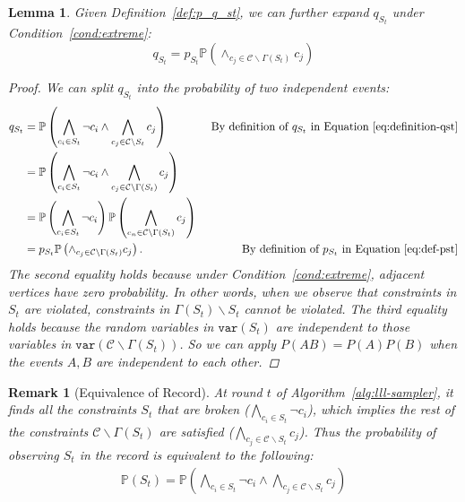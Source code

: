 \documentclass[letterpaper]{article} %
\newtheorem{remark}{Remark}
\newtheorem{lemma}{Lemma}
\newcommand{\var}{\mathtt{var}}
\newcommand{\p}{\mathbb{P}}
\begin{document}
\begin{lemma} \label{lem:recursion_start}
Given Definition~\ref{def:p_q_st}, we can further expand $q_{S_t}$ under Condition~\ref{cond:extreme}:
\begin{equation*}
q_{S_t}= p_{S_t}\p \left( \wedge_{c_j \in \mathcal{C}\backslash \Gamma(S_t)}c_j\right)
\end{equation*}
\begin{proof}
We can split $q_{S_t}$ into the probability of two independent events:
\begin{align*} 
    q_{S_t}&=\p\left(\bigwedge_{c_i \in S_t}\neg{c}_i \wedge \bigwedge_{c_j \in \mathcal{C}\backslash S_t}c_j\right) &\text{ By definition of $q_{S_t}$ in Equation~\eqref{eq:definition-qst}}\\
    &=\p\left(\bigwedge_{c_i \in S_t}\neg{c}_i \wedge \bigwedge_{c_j \in \mathcal{C}\backslash \Gamma(S_t)}c_j\right) \\
    &=\p\left(\bigwedge_{c_i \in S_t}\neg{c}_i\right) \p \left( \bigwedge_{c_n \in \mathcal{C}\backslash \Gamma(S_t)}c_j\right)\\
    &= p_{S_t}\p \left( \wedge_{c_j \in \mathcal{C}\backslash \Gamma(S_t)}c_j\right). &\text{ By definition of $p_{S_t}$ in Equation~\eqref{eq:def-pst}}
\end{align*}
The second equality holds because under  Condition~\ref{cond:extreme}, adjacent vertices have zero probability. In other words, when we observe that constraints in $S_t$ are violated, constraints in $\Gamma(S_t)\backslash S_t$ cannot be violated. The third equality holds because the random variables in $\var(S_t)$ are \textit{independent to} 
those variables in $\var(\mathcal{C}\backslash\Gamma(S_t))$. {So we can apply $P(AB)=P(A)P(B)$ when the events $A,B$  are independent to each other.}
\end{proof}
\end{lemma}

\begin{remark}[Equivalence of Record] \label{rem:equal}
At round $t$ of Algorithm~\ref{alg:lll-sampler},  it finds all the constraints $S_t$ that are broken ($\bigwedge_{c_i \in S_t}\neg{c}_i $), which implies the rest of the constraints $\mathcal{C}\backslash \Gamma(S_t)$ are satisfied ($\bigwedge_{c_j \in \mathcal{C}\backslash S_t}c_j$). Thus the probability of observing $S_t$ in the record is equivalent to the following:
\begin{align} \label{eq:st-expand}
\p(S_t)=\p\left(\bigwedge_{c_i \in S_t}\neg{c}_i \wedge \bigwedge_{c_j \in \mathcal{C}\backslash S_t}c_j\right)
\end{align}
\end{remark}
\end{document}

